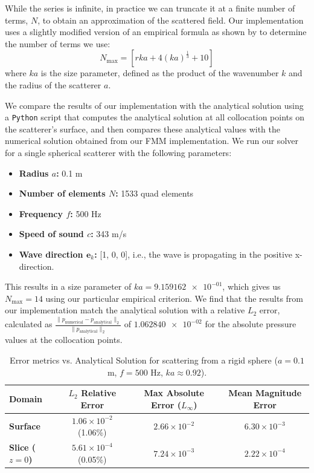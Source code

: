 While the series is infinite, in practice we can truncate it at a finite number of terms, $N$, to obtain an approximation of the scattered field. Our implementation uses a slightly modified version of an empirical formula as shown by \cite{wiscombeimprovedmiescattering1980} to determine the number of terms we use:
\begin{equation*}
    N_{\text{max}} = \left[r ka + 4(ka)^{\frac{1}{3}} + 10 \right]
\end{equation*}
where $ka$ is the size parameter, defined as the product of the wavenumber $k$ and the radius of the scatterer $a$. 

We compare the results of our implementation with the analytical solution using a \texttt{Python} script that computes the analytical solution at all collocation points on the scatterer's surface, and then compares these analytical values with the numerical solution obtained from our \ac{FMM} implementation. 
We run our solver for a single spherical scatterer with the following parameters: 
\begin{itemize}
    \item \textbf{Radius $a$:} 0.1 m
    \item \textbf{Number of elements $N$:} 1533 quad elements
    \item \textbf{Frequency $f$:} 500 Hz
    \item \textbf{Speed of sound $c$:} 343 m/s
    \item \textbf{Wave direction $\mathbf{e}_k$:} [1, 0, 0],  i.e., the wave is propagating in the positive x-direction.
\end{itemize}

This results in a size parameter of $ka =\num{9.159162e-01}$, which gives us $N_{\text{max}} = 14$ using our particular empirical criterion. We find that the results from our implementation match the analytical solution with a relative $L_2$ error, calculated as $ \frac{\| p_{\mathrm{numerical}} - p_{\mathrm{analytical}} \|_2}{\| p_{\mathrm{analytical}} \|_2} $ of $\num{1.062840e-02}$ for the absolute pressure values at the collocation points.
\begin{table}[htbp]
    \centering
    \caption{Error metrics vs. Analytical Solution for scattering from a rigid sphere ($a = 0.1$ m, $f = 500$ Hz, $ka \approx 0.92$).}
    \label{tab:sphere_error_metrics}
    \begin{tabular}{lccc}
        \toprule
        \textbf{Domain} & \textbf{$L_2$ Relative Error} & \textbf{Max Absolute Error ($L_\infty$)} & \textbf{Mean Magnitude Error} \\
        \midrule
        \textbf{Surface} & $1.06 \times 10^{-2}$ (1.06\%) & $2.66 \times 10^{-2}$ & $6.30 \times 10^{-3}$ \\
        \textbf{Slice ($z=0$)} & $5.61 \times 10^{-4}$ (0.05\%) & $7.24 \times 10^{-3}$ & $2.22 \times 10^{-4}$ \\
        \bottomrule
    \end{tabular}
\end{table}

